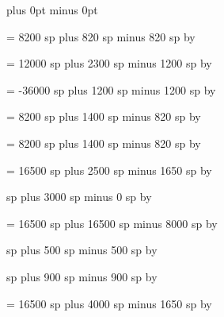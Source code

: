 
\newskip\zerowidthspace
\zerowidthspace=0pt plus 0pt minus 0pt

\newskip\interglyphspace
\interglyphspace = 8200 sp plus 820 sp minus 820 sp
\multiply\interglyphspace by \factor

\newskip\alterationspace
\alterationspace = 12000 sp plus 2300 sp minus 1200 sp
\multiply\alterationspace by \factor

\newskip\beforealterationspace
\beforealterationspace = -36000 sp plus 1200 sp minus 1200 sp
\multiply\beforealterationspace by \factor

\newskip\interelementspace
\interelementspace = 8200 sp plus 1400 sp minus 820 sp
\multiply\interelementspace by \factor

\newskip\largerspace
\largerspace = 8200 sp plus 1400 sp minus 820 sp
\multiply\largerspace by \factor

\newskip\glyphspace
\glyphspace = 16500 sp plus 2500 sp minus 1650 sp
\multiply\glyphspace by \factor

\newskip\intersyllablespace
{} sp plus 3000 sp minus 0 sp
\multiply\intersyllablespace by \factor

\newskip\spacebeforecusto
\spacebeforecusto = 16500 sp plus 16500 sp minus 8000 sp
\multiply\spacebeforecusto by \factor

\newskip\spacebeforesigns
{} sp plus 500 sp minus 500 sp
\multiply\spacebeforesigns by \factor

\newskip\spaceaftersigns
{} sp plus 900 sp minus 900 sp
\multiply\spaceaftersigns by \factor

\newskip\spaceafterlineclef
\spaceafterlineclef = 16500 sp plus 4000 sp minus 1650 sp
\multiply\spaceafterlineclef by \factor

